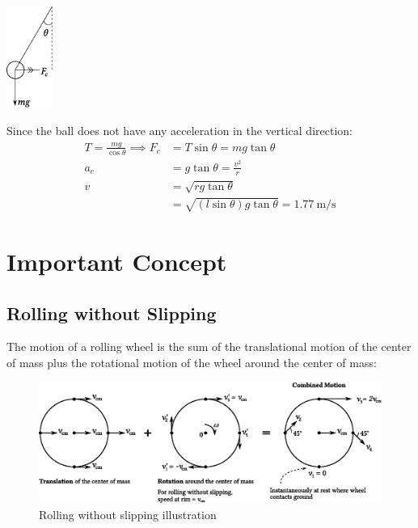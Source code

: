 \documentclass[answers]{exam}
\begin{document}
\begin{questions}
{\begin{solutionorbox}[40mm]
	\begin{minipage}{3cm} 
		\hspace{0.7cm}
		\includegraphics[width=1.5cm]{tetherball.eps}
	\end{minipage}
	\begin{minipage}{\linewidth - 3cm}
	Since the ball does not have any acceleration in the vertical direction:
		\begin{align*}
			T=\frac{mg}{\cos\theta} \implies F_c &= T\sin\theta = mg\tan\theta \\
			a_c &=g\tan\theta=\frac{v^2}{r} \\
			v &= \sqrt{rg\tan\theta} \\
			&= \sqrt{\left(l\sin\theta\right)g\tan\theta} = \SI{1.77}{\meter\per\second}
		\end{align*}
	\end{minipage}
\end{solutionorbox}
}

\ifprintanswers
	\vfill
	\section*{Important Concept}
	\vspace{-0.5cm}
	\vspace{-0.5cm}
	\subsection*{Rolling without Slipping}
	
	The motion of a rolling wheel is the sum of the translational motion of the center of mass plus the rotational motion of the wheel around the center of mass:
	
	\begin{figure}[h]
		\centering
		\includegraphics[width=0.9\linewidth]{rollingwithoutslipping.eps}
		\caption{Rolling without slipping illustration}
		\label{fig:rollingwithoutslipping}
	\end{figure}
	\vspace{-0.5cm}
	\vfill
	\pagebreak
\fi


\end{questions}
\end{document}
